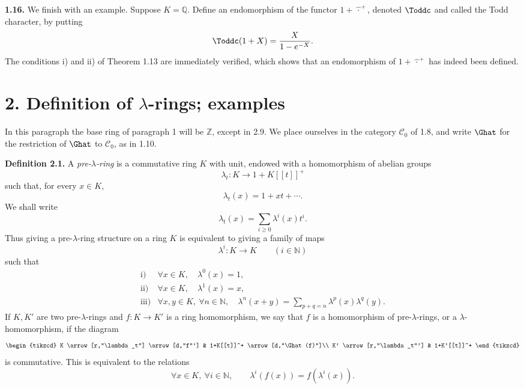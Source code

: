 \textbf{1.16.} We finish with an example. Suppose \(K=\mathbb Q\). Define an endomorphism of the functor \(1+\widehat{\,\cdot\,}^{+}\), denoted \(\Toddc\) and called the Todd character, by putting
\[
  \Toddc(1+X)=\frac{X}{1-e^{-X}}.
\]
The conditions i) and ii) of Theorem 1.13 are immediately verified, which shows that an endomorphism of \(1+\widehat{\,\cdot\,}^{+}\) has indeed been defined.

\section*{2. Definition of \(\lambda\)-rings; examples}

In this paragraph the base ring of paragraph 1 will be \(\mathbb Z\), except in 2.9. We place ourselves in the category \(\mathcal C_0\) of 1.8, and write \(\Ghat\) for the restriction of \(\Ghat\) to \(\mathcal C_0\), as in 1.10.

\textbf{Definition 2.1.} A \emph{pre-\(\lambda\)-ring} is a commutative ring \(K\) with unit, endowed with a homomorphism of abelian groups
\[
  \lambda_t:K\longrightarrow 1+K[[t]]^+
\]
such that, for every \(x\in K\),
\[
  \lambda_t(x)=1+xt+\cdots.
\]
We shall write
\[
  \lambda_t(x)=\sum_{i\geq 0}\lambda^i(x)t^i.
\]
Thus giving a pre-\(\lambda\)-ring structure on a ring \(K\) is equivalent to giving a family of maps
\[
  \lambda^i:K\longrightarrow K\qquad (i\in\mathbb N)
\]
such that
\[
\begin{array}{ll}
\text{i)}&\forall x\in K,\quad \lambda^0(x)=1,\\[0.3em]
\text{ii)}&\forall x\in K,\quad \lambda^1(x)=x,\\[0.3em]
\text{iii)}&\forall x,y\in K,\ \forall n\in\mathbb N,\quad
\lambda^n(x+y)=\displaystyle\sum_{p+q=n}\lambda^p(x)\lambda^q(y).
\end{array}
\]
If \(K,K'\) are two pre-\(\lambda\)-rings and \(f:K\to K'\) is a ring homomorphism, we say that \(f\) is a homomorphism of pre-\(\lambda\)-rings, or a \(\lambda\)-homomorphism, if the diagram
\[
\begin{tikzcd}
K \arrow[r,"\lambda_t"] \arrow[d,"f"'] &
1+K[[t]]^+ \arrow[d,"\Ghat(f)"]\\
K' \arrow[r,"\lambda_t"'] &
1+K'[[t]]^+
\end{tikzcd}
\]
is commutative. This is equivalent to the relations
\[
  \forall x\in K,\ \forall i\in\mathbb N,\qquad
  \lambda^i(f(x))=f(\lambda^i(x)).
\]

